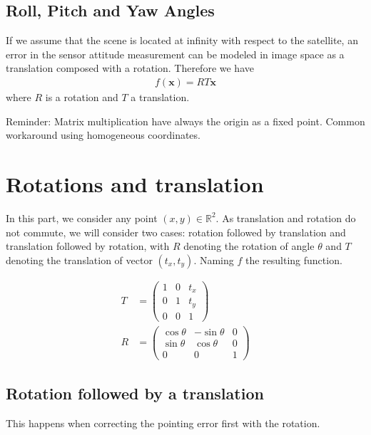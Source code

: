 \documentclass[paper=a4, fontsize=11pt]{article}
\begin{document}
\subsection{Roll, Pitch and Yaw Angles}
If we assume that the scene is located at infinity with respect to the satellite, an error in the sensor attitude measurement can be modeled in image space as a translation composed with a rotation. Therefore we have
\begin{align*}
f(\textbf{x}) = RT\textbf{x}
\end{align*}
where $R$ is a rotation and $T$ a translation.\\

\appendix

Reminder: Matrix multiplication have always the origin as a fixed point. Common workaround using homogeneous coordinates.

\section{Rotations and translation}

In this part, we consider any point \((x, y) \in \mathbb{R}^2\). As translation and rotation do not commute, we will consider two cases: rotation followed by translation and translation followed by rotation, with \(R\) denoting the rotation of angle \(\theta\) and \(T\) denoting the translation of vector \((t_x, t_y)\). Naming \(f\) the resulting function.

\begin{align*}
	T &=
		\begin{pmatrix}
			1 & 0 & t_x \\
			0 & 1 & t_y \\
			0 & 0 & 1
		\end{pmatrix}
		\\
	R &=
		\begin{pmatrix}
			\cos \theta & -\sin \theta & 0 \\
			\sin \theta & \cos \theta & 0 \\
			0 & 0 & 1
		\end{pmatrix}
\end{align*}


\subsection{Rotation followed by a translation}
This happens when correcting the pointing error first with the rotation.
\end{document}
